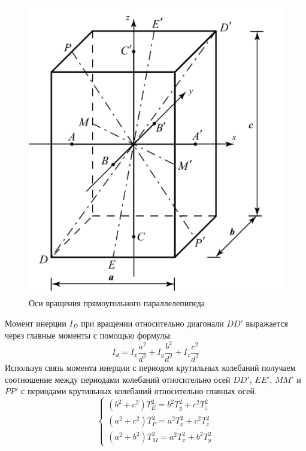 \documentclass[a4paper, 12pt]{article}
\begin{document}
	\begin{figure}[H]
	    \begin{center}
	        \includegraphics[scale=0.5]{pictures/kyb.png}
	        \caption{Оси вращения прямоугольного параллелепипеда}
	        \label{graphic1}
	    \end{center}
	\end{figure}

	Момент инерции $I_{D}$ при вращении относительно диагонали $DD'$ выражается
	 через главные моменты с помощью формулы:
	\begin{equation}
	    I_{d}=I_{x}\frac{a^2}{d^2}+I_{y}\frac{b^2}{d^2}+I_{z}\frac{c^2}{d^2}
	\end{equation}
	Используя связь момента инерции с периодом крутильных колебаний
	получаем соотношение между периодами колебаний относительно осей $DD'$, $EE'$,
	$MM'$ и $PP'$ с периодами крутильных колебаний относительно главных осей.
	\begin{equation}
		\begin{cases}
		(b^2+c^2)T^2_{E}=b^2 T^2_{y}+c^2 T^2_{z} \\
		(a^2+c^2)T^2_{P}=a^2 T^2_{x}+c^2 T^2_{z} \\
		(a^2+b^2)T^2_{M}=a^2 T^2_{x}+b^2 T^2_{y}
		\end{cases}
	\end{equation}
\end{document}
